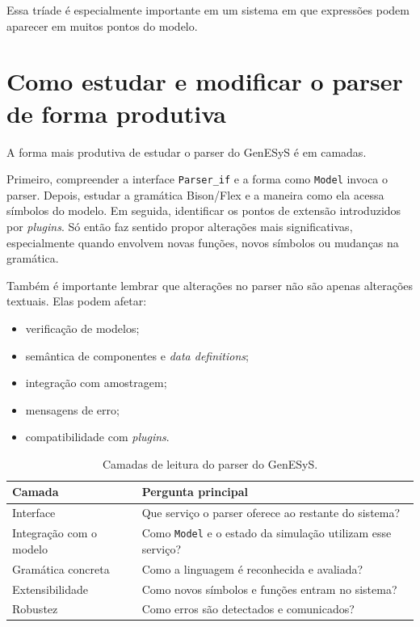 Essa tríade é especialmente importante em um sistema em que expressões podem aparecer em muitos pontos do modelo.

\section{Como estudar e modificar o parser de forma produtiva}
\label{sec:cap9_como_estudar_modificar_parser}

A forma mais produtiva de estudar o parser do GenESyS é em camadas.

Primeiro, compreender a interface \texttt{Parser\_if} e a forma como \texttt{Model} invoca o parser. Depois, estudar a gramática Bison/Flex e a maneira como ela acessa símbolos do modelo. Em seguida, identificar os pontos de extensão introduzidos por \textit{plugins}. Só então faz sentido propor alterações mais significativas, especialmente quando envolvem novas funções, novos símbolos ou mudanças na gramática.

Também é importante lembrar que alterações no parser não são apenas alterações textuais. Elas podem afetar:
\begin{itemize}
    \item verificação de modelos;
    \item semântica de componentes e \textit{data definitions};
    \item integração com amostragem;
    \item mensagens de erro;
    \item compatibilidade com \textit{plugins}.
\end{itemize}

\begin{table}[htbp]
    \centering
    \caption{Camadas de leitura do parser do GenESyS.}
    \label{tab:cap9_camadas_leitura_parser}
    \small
    \begin{tabular}{|p{3.9cm}|p{7.3cm}|}
        \hline
        \textbf{Camada} & \textbf{Pergunta principal} \\
        \hline
        Interface & Que serviço o parser oferece ao restante do sistema? \\
        \hline
        Integração com o modelo & Como \texttt{Model} e o estado da simulação utilizam esse serviço? \\
        \hline
        Gramática concreta & Como a linguagem é reconhecida e avaliada? \\
        \hline
        Extensibilidade & Como novos símbolos e funções entram no sistema? \\
        \hline
        Robustez & Como erros são detectados e comunicados? \\
        \hline
    \end{tabular}
\end{table}

